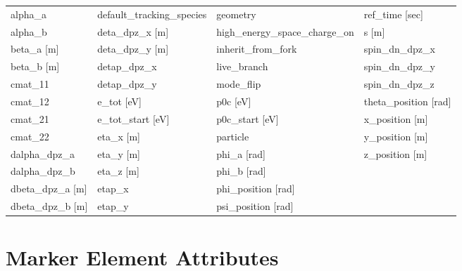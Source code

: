  \begin{tabular}{llll} \toprule
alpha_a                          & default_tracking_species         & geometry                         & ref_time [sec]                   \\
alpha_b                          & deta_dpz_x [m]                   & high_energy_space_charge_on      & s [m]                            \\
beta_a [m]                       & deta_dpz_y [m]                   & inherit_from_fork                & spin_dn_dpz_x                    \\
beta_b [m]                       & detap_dpz_x                      & live_branch                      & spin_dn_dpz_y                    \\
cmat_11                          & detap_dpz_y                      & mode_flip                        & spin_dn_dpz_z                    \\
cmat_12                          & e_tot [eV]                       & p0c [eV]                         & theta_position [rad]             \\
cmat_21                          & e_tot_start [eV]                 & p0c_start [eV]                   & x_position [m]                   \\
cmat_22                          & eta_x [m]                        & particle                         & y_position [m]                   \\
dalpha_dpz_a                     & eta_y [m]                        & phi_a [rad]                      & z_position [m]                   \\
dalpha_dpz_b                     & eta_z [m]                        & phi_b [rad]                      &                                  \\
dbeta_dpz_a [m]                  & etap_x                           & phi_position [rad]               &                                  \\
dbeta_dpz_b [m]                  & etap_y                           & psi_position [rad]               &                                  \\
 \bottomrule
 \end{tabular}
 \vfill
 
 \section{Marker Element Attributes}
 \label{s:list.marker}
 
